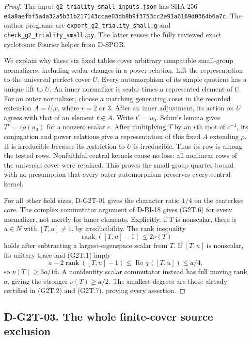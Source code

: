 \begin{proof}
The input \texttt{g2\_triality\_small\_inputs.json} has SHA-256
\texttt{e4a8aefbf5a4a32a5b31b217143ccae03db8b9f3753cc2e91a6169d0364b6a7c}.
The author programs are \texttt{export\_g2\_triality\_small.g}
and \texttt{check\_g2\_triality\_small.py}.  The latter reuses
the fully reviewed exact cyclotomic Fourier helper from D-SPOR.

We explain why these six fixed tables cover arbitrary compatible
small-group normalizers, including scalar changes in a power
relation.  Lift the representation to the universal perfect cover
$U$.  Every automorphism of its simple quotient has a unique
lift to $U$.  An inner normalizer is scalar times a represented
element of $U$.  For an outer normalizer, choose a matching
generating coset in the recorded extension $A=U.r$,
where $r=2$ or $3$.  After an inner adjustment, its action on
$U$ agrees with that of an element $t\in A$.  Write $t^r=u_0$.
Schur's lemma gives $T^r=c\rho(u_0)$ for a nonzero scalar $c$.
After multiplying $T$ by an $r$th root of $c^{-1}$, its
conjugation and power relations give a representation of this
fixed $A$ extending $\rho$.  It is irreducible because its
restriction to $U$ is irreducible.  Thus its row is among the
tested rows.  Nonfaithful central kernels cause no loss: all
nonlinear rows of the universal cover were retained.  This proves
the small-group quarter bound with no presumption that every
outer automorphism preserves every central kernel.

For all other field sizes, D-G2T-01 gives the character ratio
$1/4$ on the centerless core.  The complex commutator argument
of D-BI-18 gives (G2T.6) for every normalizer, not merely for
inner elements.  Explicitly, if $T$ is nonscalar, there is
$u\in N$ with $[T,u]\ne1$, by irreducibility.  The rank
inequality
\[
                \operatorname{rank}([T,u]-1)\le2\nu(T)
\]
holds after subtracting a largest-eigenspace scalar from $T$.
If $[T,u]$ is nonscalar, its unitary trace and (G2T.1) imply
\[
 a-2\operatorname{rank}([T,u]-1)
       \le\operatorname{Re}\chi([T,u])\le a/4,
\]
so $\nu(T)\ge3a/16$.  A nonidentity scalar commutator instead
has full moving rank $a$, giving the stronger $\nu(T)\ge a/2$.
The smallest degrees are those already certified in (G2T.2)
and (G2T.7), proving every assertion.
\end{proof}

\subsection*{D-G2T-03. The whole finite-cover source exclusion}

